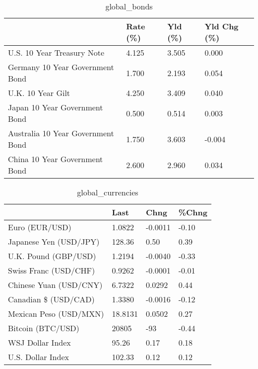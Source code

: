 \documentclass{article}%
\begin{document}
%


\begin{table}[htbp]%
\caption{global\_bonds}%
\centering%
\begin{adjustbox}{width=1\textwidth}%
\begin{tabular}{llll}
\toprule
                                  & Rate (\%) & Yld (\%) & Yld Chg (\%) \\
\midrule
       U.S. 10 Year Treasury Note &    4.125 &   3.505 &       0.000 \\
  Germany 10 Year Government Bond &    1.700 &   2.193 &       0.054 \\
                U.K. 10 Year Gilt &    4.250 &   3.409 &       0.040 \\
    Japan 10 Year Government Bond &    0.500 &   0.514 &       0.003 \\
Australia 10 Year Government Bond &    1.750 &   3.603 &      -0.004 \\
    China 10 Year Government Bond &    2.600 &   2.960 &       0.034 \\
\bottomrule
\end{tabular}
%
\end{adjustbox}%
\end{table}

%


\begin{table}[htbp]%
\caption{global\_currencies}%
\centering%
\begin{adjustbox}{width=1\textwidth}%
\begin{tabular}{llll}
\toprule
                       &    Last &    Chng & \%Chng \\
\midrule
        Euro (EUR/USD) &  1.0822 & -0.0011 & -0.10 \\
Japanese Yen (USD/JPY) &  128.36 &    0.50 &  0.39 \\
  U.K. Pound (GBP/USD) &  1.2194 & -0.0040 & -0.33 \\
 Swiss Franc (USD/CHF) &  0.9262 & -0.0001 & -0.01 \\
Chinese Yuan (USD/CNY) &  6.7322 &  0.0292 &  0.44 \\
  Canadian \$ (USD/CAD) &  1.3380 & -0.0016 & -0.12 \\
Mexican Peso (USD/MXN) & 18.8131 &  0.0502 &  0.27 \\
     Bitcoin (BTC/USD) &   20805 &     -93 & -0.44 \\
      WSJ Dollar Index &   95.26 &    0.17 &  0.18 \\
     U.S. Dollar Index &  102.33 &    0.12 &  0.12 \\
\bottomrule
\end{tabular}
%
\end{adjustbox}%
\end{table}
\end{document}
